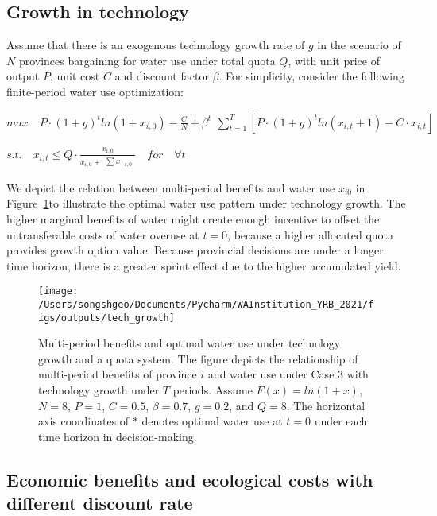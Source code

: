 \documentclass{article}
\begin{document}
\subsection*{Growth in technology}

Assume that there is an exogenous technology growth rate of $g$ in the scenario of $N$ provinces bargaining for water use under total quota $Q$, with unit price of output $P$, unit cost $C$ and discount factor $\beta$. For simplicity, consider the following finite-period water use optimization:

$ max \quad P \cdot (1+g)^t ln(1+x_{i,0})-\frac{C}{N}+\beta^t \begin{matrix} \sum_{t=1}^T [P \cdot (1+g)^t ln(x_{i,t}+1)-C \cdot x_{i,t}] \end{matrix}$

$s.t. \quad x_{i,t} \leq Q \cdot \frac{x_{i,0}}{x_{i,0} + \begin{matrix} \sum x_{-i,0} \end{matrix}} \quad for \quad \forall t$

We depict the relation between multi-period benefits and water use $x_{i0}$ in Figure~\ref{fig:tech_growth}to illustrate the optimal water use pattern under technology growth. The higher marginal benefits of water might create enough incentive to offset the untransferable costs of water overuse at $t=0$, because a higher allocated quota provides growth option value. Because provincial decisions are under a longer time horizon, there is a greater sprint effect due to the higher accumulated yield.

\begin{figure}[!h]
	\centering
	\texttt{[image: /Users/songshgeo/Documents/Pycharm/WAInstitution\_YRB\_2021/figs/outputs/tech\_growth]}
	\caption{Multi-period benefits and optimal water use under technology growth and a quota system. The figure depicts the relationship of multi-period benefits of province $i$ and water use under Case 3 with technology growth under $T$ periods. Assume $F(x)=ln(1+x)$, $N=8$, $P=1$, $C=0.5$, $\beta=0.7$, $g=0.2$, and $Q=8$. The horizontal axis coordinates of $*$ denotes optimal water use at $t=0$ under each time horizon in decision-making.}
	\label{fig:tech_growth}
\end{figure}

\subsection*{Economic benefits and ecological costs with different discount rate}
\end{document}
